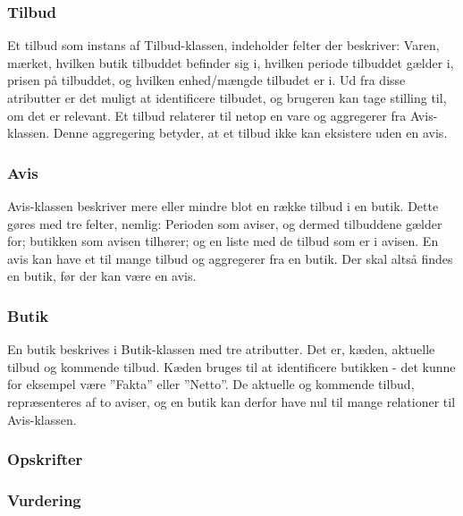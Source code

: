 \subsubsection{Tilbud}
Et tilbud som instans af Tilbud-klassen, indeholder felter der beskriver: Varen, mærket, hvilken butik tilbuddet befinder sig i, hvilken periode tilbuddet gælder i, prisen på tilbuddet, og hvilken enhed/mængde tilbudet er i.
Ud fra disse atributter er det muligt at identificere tilbudet, og brugeren kan tage stilling til, om det er relevant.
Et tilbud relaterer til netop en vare og aggregerer fra Avis-klassen.
Denne aggregering betyder, at et tilbud ikke kan eksistere uden en avis.

\subsubsection{Avis}
Avis-klassen beskriver mere eller mindre blot en række tilbud i en butik.
Dette gøres med tre felter, nemlig: Perioden som aviser, og dermed tilbuddene gælder for; butikken som avisen tilhører; og en liste med de tilbud som er i avisen.
En avis kan have et til mange tilbud og aggregerer fra en butik.
Der skal altså findes en butik, før der kan være en avis.

\subsubsection{Butik}
En butik beskrives i Butik-klassen med tre atributter.
Det er, kæden, aktuelle tilbud og kommende tilbud. Kæden bruges til at identificere butikken - det kunne for eksempel være ''Fakta'' eller ''Netto''.
De aktuelle og kommende tilbud, repræsenteres af to aviser, og en butik kan derfor have nul til mange relationer til Avis-klassen.

\subsubsection{Opskrifter}
\lipsum[1]

\subsubsection{Vurdering}
\lipsum[1]
